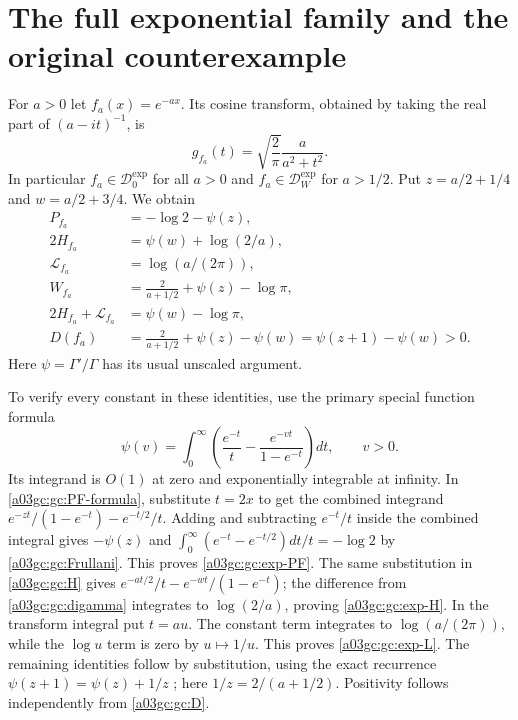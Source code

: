 \documentclass[11pt,a4paper]{article}
\begin{document}
\section{The full exponential family and the original counterexample}

For $a>0$ let $f_a(x)=e^{-ax}$.  Its cosine transform, obtained by taking
the real part of $(a-it)^{-1}$, is
\begin{equation}
 g_{f_a}(t)=\sqrt{\frac2\pi}\frac{a}{a^2+t^2}.
 \label{a03gc:gc:exponential-transform}
\end{equation}
In particular $f_a\in\mathcal D_0^{\exp}$ for all $a>0$ and
$f_a\in\mathcal D_W^{\exp}$ for $a>1/2$.
Put $z=a/2+1/4$ and $w=a/2+3/4$.  We obtain
\begin{align}
 P_{f_a}&=-\log2-\psi(z),\label{a03gc:gc:exp-PF}\\
 2H_{f_a}&=\psi(w)+\log(2/a),\label{a03gc:gc:exp-H}\\
 \mathscr L_{f_a}&=\log(a/(2\pi)),\label{a03gc:gc:exp-L}\\
 W_{f_a}&=\frac{2}{a+1/2}+\psi(z)-\log\pi,
 \label{a03gc:gc:exp-W}\\
 2H_{f_a}+\mathscr L_{f_a}&=\psi(w)-\log\pi,
 \label{a03gc:gc:exp-right}\\
 D(f_a)&=\frac{2}{a+1/2}+\psi(z)-\psi(w)
       =\psi(z+1)-\psi(w)>0.
 \label{a03gc:gc:exp-D}
\end{align}
Here $\psi=\Gamma'/\Gamma$ has its usual unscaled argument.

To verify every constant in these identities, use the primary special
function formula \cite[5.9.12]{a03gc:dlmf}
\begin{equation}
 \psi(v)=\int_0^\infty
 \left(\frac{e^{-t}}t-\frac{e^{-vt}}{1-e^{-t}}\right)dt,
 \qquad v>0.
 \label{a03gc:gc:digamma}
\end{equation}
Its integrand is $O(1)$ at zero and exponentially integrable at infinity.
In \eqref{a03gc:gc:PF-formula}, substitute $t=2x$ to get the combined
integrand $e^{-zt}/(1-e^{-t})-e^{-t/2}/t$.
Adding and subtracting $e^{-t}/t$ inside the combined integral gives
$-\psi(z)$ and
$\int_0^\infty(e^{-t}-e^{-t/2})dt/t=-\log2$ by
\eqref{a03gc:gc:Frullani}.  This proves \eqref{a03gc:gc:exp-PF}.
The same substitution in \eqref{a03gc:gc:H} gives
$e^{-at/2}/t-e^{-wt}/(1-e^{-t})$; the difference from
\eqref{a03gc:gc:digamma} integrates to $\log(2/a)$, proving
\eqref{a03gc:gc:exp-H}.
In the transform integral put $t=au$.  The constant term integrates to
$\log(a/(2\pi))$, while the $\log u$ term is zero by $u\mapsto1/u$.
This proves \eqref{a03gc:gc:exp-L}.  The remaining identities follow by
substitution, using the exact recurrence
$\psi(z+1)=\psi(z)+1/z$ \cite[5.5.2]{a03gc:dlmf}; here
$1/z=2/(a+1/2)$.  Positivity follows independently from \eqref{a03gc:gc:D}.
\end{document}
